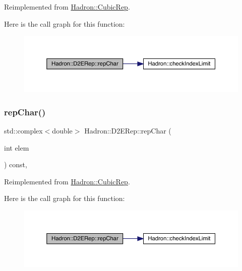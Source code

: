 Reimplemented from \mbox{\hyperlink{structHadron_1_1CubicRep_af45227106e8e715e84b0af69cd3b36f8}{Hadron\+::\+Cubic\+Rep}}.

Here is the call graph for this function\+:
\nopagebreak
\begin{figure}[H]
\begin{center}
\leavevmode
\includegraphics[width=350pt]{d4/d82/structHadron_1_1D2ERep_a0507e2c08a6c305e5f0fc4f36a92f0be_cgraph}
\end{center}
\end{figure}
\mbox{\label{structHadron_1_1D2ERep_a0507e2c08a6c305e5f0fc4f36a92f0be}} 
\subsubsection{\texorpdfstring{repChar()}{repChar()}\hspace{0.1cm}{\footnotesize\ttfamily [3/3]}}
{\footnotesize\ttfamily std\+::complex$<$double$>$ Hadron\+::\+D2\+E\+Rep\+::rep\+Char (\begin{DoxyParamCaption}\item[{int}]{elem }\end{DoxyParamCaption}) const\hspace{0.3cm}{\ttfamily [inline]}, {\ttfamily [virtual]}}



Reimplemented from \mbox{\hyperlink{structHadron_1_1CubicRep_af45227106e8e715e84b0af69cd3b36f8}{Hadron\+::\+Cubic\+Rep}}.

Here is the call graph for this function\+:
\nopagebreak
\begin{figure}[H]
\begin{center}
\leavevmode
\includegraphics[width=350pt]{d4/d82/structHadron_1_1D2ERep_a0507e2c08a6c305e5f0fc4f36a92f0be_cgraph}
\end{center}
\end{figure}
\mbox{\label{structHadron_1_1D2ERep_a0d6937e2a9cf2e22df238b7e3eafbf8e}} 
